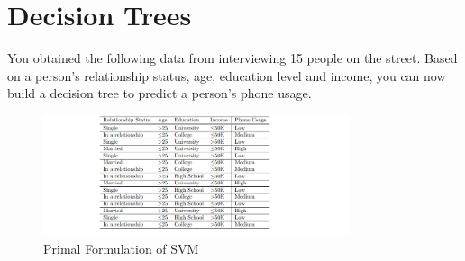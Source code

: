 \documentclass[a3paper,12pt]{extarticle} %
\begin{document}
\section{Decision Trees}
You obtained the following data from interviewing 15 people on the street. Based on a person’s relationship
status, age, education level and income, you can now build a decision tree to predict a person’s phone usage.
\begin{figure}[h]
    \centering
    \includegraphics[width=0.8\textwidth]{section2.png}
    \caption{Primal Formulation of SVM}
    \label{fig:primal}
\end{figure}
\end{document}
